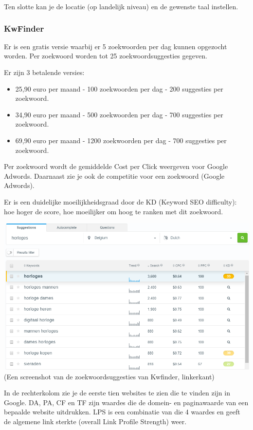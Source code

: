 Ten slotte kan je de locatie (op landelijk niveau) en de gewenste taal instellen.

\subsubsection{KwFinder}
\label{ch: KwFinder}

Er is een gratis versie waarbij er 5 zoekwoorden per dag kunnen opgezocht worden. Per zoekwoord worden tot 25 zoekwoordsuggesties gegeven. 

Er zijn 3 betalende versies: 

\begin{itemize}
\item 25,90 euro per maand - 100 zoekwoorden per dag - 200 suggesties per zoekwoord.
\item 34,90 euro per maand - 500 zoekwoorden per dag - 700 suggesties per zoekwoord.
\item 69,90 euro per maand - 1200 zoekwoorden per dag - 700 suggesties per zoekwoord.
\end{itemize}

Per zoekwoord wordt de gemiddelde Cost per Click weergeven voor Google Adwords. Daarnaast zie je ook de competitie voor een zoekwoord (Google Adwords). 

Er is een duidelijke moeilijkheidsgraad door de KD (Keyword SEO difficulty): hoe hoger de score, hoe moeilijker om hoog te ranken met dit zoekwoord. 

\includegraphics[width=\linewidth]{Bachelorproef/bachelor/img/kwfinderlinks.PNG}
(Een screenshot van de zoekwoordsuggesties van Kwfinder, linkerkant)

In de rechterkolom zie je de eerste tien websites te zien die te vinden zijn in Google. DA, PA, CF en TF zijn waardes die de domein- en paginawaarde van een bepaalde website uitdrukken. LPS is een combinatie van die 4 waardes en geeft de algemene link sterkte (overall Link Profile Strength) weer. 

